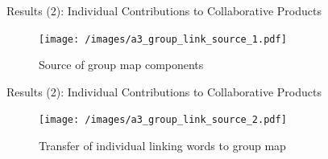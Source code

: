 \begin{frame}{Results (2): Individual Contributions to Collaborative Products}
    \begin{figure}[tb]
        \begin{center}
            \texttt{[image: /images/a3\_group\_link\_source\_1.pdf]}
        \end{center}
        \caption{Source of group map components}
        \label{group_link_s1}
    \end{figure}
\end{frame}

\begin{frame}{Results (2): Individual Contributions to Collaborative Products}
    \begin{figure}[tb]
        \begin{center}
            \texttt{[image: /images/a3\_group\_link\_source\_2.pdf]}
        \end{center}
        \caption{Transfer of individual linking words to group map}
        \label{group_link_s2}
    \end{figure}
\end{frame}


